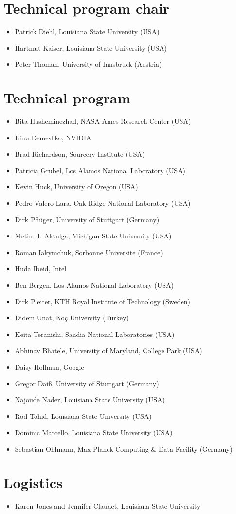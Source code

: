 \section*{Technical program chair}

\begin{itemize}
\item Patrick Diehl, Louisiana State University (USA)
\item Hartmut Kaiser, Louisiana State University (USA)
\item Peter Thoman, University of Innsbruck (Austria)
\end{itemize}

\section*{Technical program }

\begin{itemize}
\item Bita Hasheminezhad, NASA Ames Research Center (USA)
\item Irina Demeshko, NVIDIA
\item Brad Richardson, Sourcery Institute (USA)
\item Patricia Grubel, Los Alamos National Laboratory (USA)
\item Kevin Huck, University of Oregon (USA)
\item Pedro Valero Lara, Oak Ridge National Laboratory (USA)
\item Dirk Pflüger, University of Stuttgart (Germany)
\item Metin H. Aktulga, Michigan State University (USA)
\item Roman Iakymchuk, Sorbonne Universite (France)
\item Huda Ibeid, Intel
\item Ben Bergen, Los Alamos National Laboratory (USA)
\item Dirk Pleiter, KTH Royal Institute of Technology (Sweden)
\item Didem Unat, Koç University (Turkey)
\item Keita Teranishi, Sandia National Laboratories (USA)
\item Abhinav Bhatele, University of Maryland, College Park (USA)
\item Daisy Hollman, Google
\item Gregor Daiß, University of Stuttgart (Germany)
\item Najoude Nader, Louisiana State University (USA)
\item Rod Tohid, Louisiana State University (USA)
\item Dominic Marcello, Louisiana State University (USA)
\item Sebastian Ohlmann, Max Planck Computing \& Data Facility (Germany)
\end{itemize}


\section*{Logistics}
\begin{itemize}
\item Karen Jones and Jennifer Claudet, Louisiana State University
\end{itemize}

